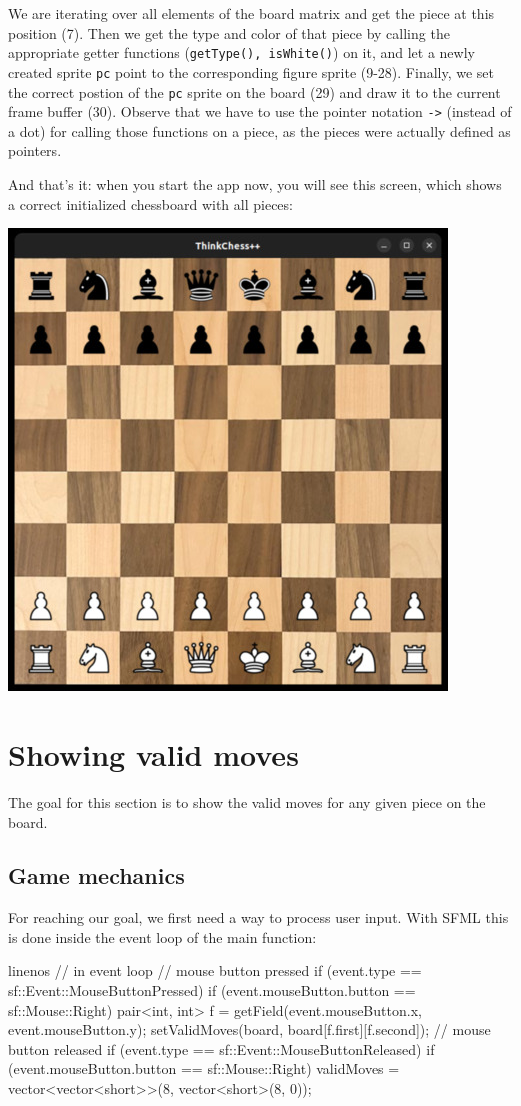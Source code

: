 We are iterating over all elements of the board matrix and get the piece at this position (7).
Then we get the type and color of that piece by calling the appropriate getter functions
(\texttt{getType(), isWhite()}) on it, and let a newly created sprite \texttt{pc}
point to the corresponding figure sprite (9-28).
Finally, we set the correct postion of the \texttt{pc} sprite on the board (29) and draw it
to the current frame buffer (30).
Observe that we have to use the pointer notation \texttt{->} (instead of a dot) for calling
those functions on a piece, as the pieces were actually defined as pointers.

And that's it: when you start the app now, you will see this screen, which shows a
correct initialized chessboard with all pieces:

\begin{center}
\includegraphics[width=.5\linewidth]{img/boardWithPieces.jpg}
\end{center}


\section{Showing valid moves}\label{sec:validmoves}
The goal for this section is to show the valid moves for any given piece on the board.
\subsection{Game mechanics}

For reaching our goal, we first need a way to process user input.
With SFML this is done inside the event loop of the main function:

\begin{cpp*}{linenos}
      // in event loop
      // mouse button pressed
      if (event.type == sf::Event::MouseButtonPressed) {
        if (event.mouseButton.button == sf::Mouse::Right) {
          pair<int, int> f =
            getField(event.mouseButton.x, event.mouseButton.y);
          setValidMoves(board, board[f.first][f.second]);
        }
      }
      // mouse button released
      if (event.type == sf::Event::MouseButtonReleased) {
        if (event.mouseButton.button == sf::Mouse::Right) {
          validMoves =
            vector<vector<short>>(8, vector<short>(8, 0));
        }
      }
\end{cpp*}

